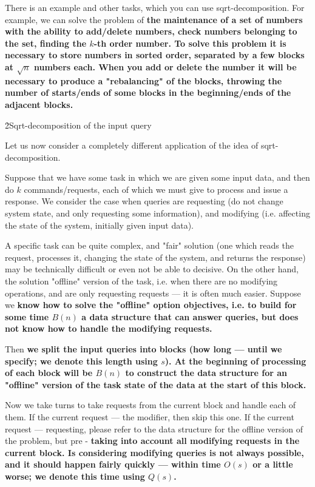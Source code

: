 There is an example and other tasks, which you can use sqrt-decomposition. For example, we can solve the problem of \bf{the maintenance of a set of numbers} with the ability to add/delete numbers, check numbers belonging to the set, finding the $k$-th order number. To solve this problem it is necessary to store numbers in sorted order, separated by a few blocks at $\sqrt{n}$ numbers each. When you add or delete the number it will be necessary to produce a "rebalancing" of the blocks, throwing the number of starts/ends of some blocks in the beginning/ends of the adjacent blocks.


\h2{Sqrt-decomposition of the input query}

Let us now consider a completely different application of the idea of sqrt-decomposition.

Suppose that we have some task in which we are given some input data, and then do $k$ commands/requests, each of which we must give to process and issue a response. We consider the case when queries are requesting (do not change system state, and only requesting some information), and modifying (i.e. affecting the state of the system, initially given input data).

A specific task can be quite complex, and "fair" solution (one which reads the request, processes it, changing the state of the system, and returns the response) may be technically difficult or even not be able to decisive. On the other hand, the solution "offline" version of the task, i.e. when there are no modifying operations, and are only requesting requests --- it is often much easier. Suppose we \bf{know how to solve the "offline" option} objectives, i.e. to build for some time $B(n)$ a data structure that can answer queries, but does not know how to handle the modifying requests.

Then \bf{we split the input queries into blocks} (how long --- until we specify; we denote this length using $s$). At the beginning of processing of each block will be $B(n)$ to construct the data structure for an "offline" version of the task state of the data at the start of this block.

Now we take turns to take requests from the current block and handle each of them. If the current request --- the modifier, then skip this one. If the current request --- requesting, please refer to the data structure for the offline version of the problem, but pre - \bf{taking into account all modifying requests in the current block}. Is considering modifying queries is not always possible, and it should happen fairly quickly --- within time $O(s)$ or a little worse; we denote this time using $Q(s)$.

